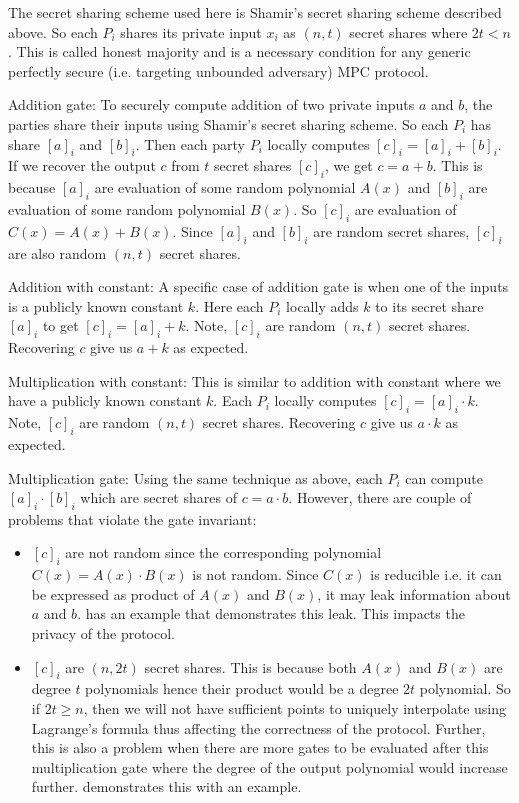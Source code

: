 \documentclass[11pt]{article}
\begin{document}
The secret sharing scheme used here is Shamir's secret sharing scheme described above. So each $P_i$ shares its private input $x_i$ as $(n, t)$ secret shares where $2t < n$. This is called honest majority and is a necessary condition for any generic perfectly secure (i.e. targeting unbounded adversary) MPC protocol.

Addition gate: To securely compute addition of two private inputs $a$ and $b$, the parties share their inputs using Shamir's secret sharing scheme. So each $P_i$ has share $[a]_i$ and $[b]_i$. Then each party $P_i$ locally computes $[c]_i = [a]_i + [b]_i$. If we recover the output $c$ from $t$ secret shares $[c]_i$, we get $c = a + b$. This is because $[a]_i$ are evaluation of some random polynomial $A(x)$ and $[b]_i$ are evaluation of some random polynomial $B(x)$. So $[c]_i$ are evaluation of $C(x) = A(x) + B(x)$. Since $[a]_i$ and $[b]_i$ are random secret shares, $[c]_i$ are also random $(n, t)$ secret shares.

Addition with constant: A specific case of addition gate is when one of the inputs is a publicly known constant $k$. Here each $P_i$ locally adds $k$ to its secret share $[a]_i$ to get $[c]_i = [a]_i + k$. Note, $[c]_i$ are random $(n, t)$ secret shares. Recovering $c$ give us $a + k$ as expected.

Multiplication with constant: This is similar to addition with constant where we have a publicly known constant $k$. Each $P_i$ locally computes $[c]_i = [a]_i \cdot k$. Note, $[c]_i$ are random $(n, t)$ secret shares. Recovering $c$ give us $a \cdot k$ as expected.

Multiplication gate: Using the same technique as above, each $P_i$ can compute $[a]_i \cdot [b]_i$ which are secret shares of $c = a \cdot b$. However, there are couple of problems that violate the gate invariant:
\begin{itemize}
    \item $[c]_i$ are not random since the corresponding polynomial $C(x) = A(x) \cdot B(x)$ is not random. Since $C(x)$ is reducible i.e. it can be expressed as product of $A(x)$ and $B(x)$, it may leak information about $a$ and $b$. \cite{18} has an example that demonstrates this leak. This impacts the privacy of the protocol.
    
    \item $[c]_i$ are $(n, 2t)$ secret shares. This is because both $A(x)$ and $B(x)$ are degree $t$ polynomials hence their product would be a degree $2t$ polynomial. So if $2t \ge n$, then we will not have sufficient points to uniquely interpolate using Lagrange's formula thus affecting the correctness of the protocol. Further, this is also a problem when there are more gates to be evaluated after this multiplication gate where the degree of the output polynomial would increase further. \cite{18} demonstrates this with an example.
\end{itemize}
\end{document}
